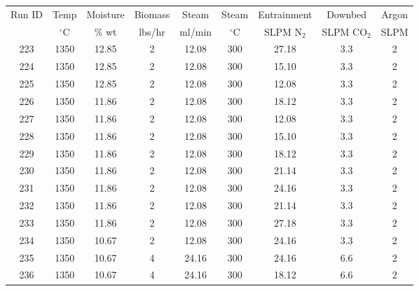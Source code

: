 \documentclass[11pt,twocolumn]{article}
\begin{document}
\begin{center}
\begin{tabular}{ccccccccc}
\toprule
Run ID &  Temp 		&  Moisture 	&  Biomass 	&  Steam 	&  Steam 		&  Entrainment & Downbed	 & Argon \\
{}       & $^\circ$C	& \% wt		& lbs/hr		& ml/min	& $^\circ$C	& SLPM N$_2$	& SLPM CO$_2$	 & SLPM \\
\midrule
223    &       1350 &     12.85 &             2 &     12.08 &       300 &       27.18 &                3.3 &           2 \\
224    &       1350 &     12.85 &             2 &     12.08 &       300 &       15.10 &                3.3 &           2 \\
225    &       1350 &     12.85 &             2 &     12.08 &       300 &       12.08 &                3.3 &           2 \\
226    &       1350 &     11.86 &             2 &     12.08 &       300 &       18.12 &                3.3 &           2 \\
227    &       1350 &     11.86 &             2 &     12.08 &       300 &       12.08 &                3.3 &           2 \\
228    &       1350 &     11.86 &             2 &     12.08 &       300 &       15.10 &                3.3 &           2 \\
229    &       1350 &     11.86 &             2 &     12.08 &       300 &       18.12 &                3.3 &           2 \\
230    &       1350 &     11.86 &             2 &     12.08 &       300 &       21.14 &                3.3 &           2 \\
231    &       1350 &     11.86 &             2 &     12.08 &       300 &       24.16 &                3.3 &           2 \\
232    &       1350 &     11.86 &             2 &     12.08 &       300 &       21.14 &                3.3 &           2 \\
233    &       1350 &     11.86 &             2 &     12.08 &       300 &       27.18 &                3.3 &           2 \\
234    &       1350 &     10.67 &             2 &     12.08 &       300 &       24.16 &                3.3 &           2 \\
235    &       1350 &     10.67 &             4 &     24.16 &       300 &       24.16 &                6.6 &           2 \\
236    &       1350 &     10.67 &             4 &     24.16 &       300 &       18.12 &                6.6 &           2 \\

\end{tabular}
\end{center}
\end{document}
